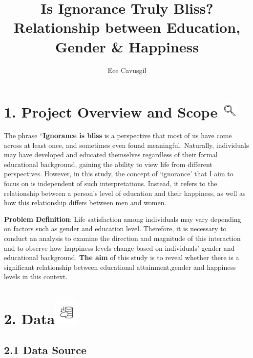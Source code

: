 \documentclass[
  11pt,
  a4paper,
  DIV=11,
  numbers=noendperiod]{scrartcl}
\title{Is Ignorance Truly Bliss? Relationship between Education, Gender
\& Happiness}
\author{Ece Cavusgil}
\date{}
\begin{document}
\maketitle


\section[1. Project Overview and Scope \hfill
]{\texorpdfstring{1. Project Overview and Scope
\protect\includegraphics[width=0.3in,height=\textheight,keepaspectratio]{assets/images/scope.png}\hfill
}{1. Project Overview and Scope }}\label{project-overview-and-scope}

The phrase ``{\textbf{Ignorance is bliss}} is a perspective that most of
us have come across at least once, and sometimes even found meaningful.
Naturally, individuals may have developed and educated themselves
regardless of their formal educational background, gaining the ability
to view life from different perspectives. However, in this study, the
concept of `ignorance' that I aim to focus on is independent of such
interpretations. Instead, it refers to the relationship between a
person's level of education and their happiness, as well as how this
relationship differs between men and women.

{\textbf{Problem Definition}}: Life satisfaction among individuals may
vary depending on factors such as gender and education level. Therefore,
it is necessary to conduct an analysis to examine the direction and
magnitude of this interaction and to observe how happiness levels change
based on individuals' gender and educational background. {\textbf{The
aim}} of this study is to reveal whether there is a significant
relationship between educational attainment,gender and happiness levels
in this context.

\section[2. Data\hfill
]{\texorpdfstring{2.
Data\protect\includegraphics[width=0.5in,height=\textheight,keepaspectratio]{assets/images/data.png}\hfill
}{2. Data}}\label{data}

\subsection{2.1 Data Source}\label{data-source}
\end{document}
